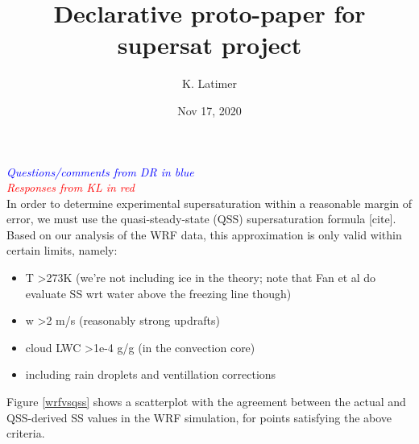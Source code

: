 \documentclass{article}
\title{Declarative proto-paper for supersat project}
\author{K. Latimer}
\date{Nov 17, 2020}
\newcommand{\drcomm}[1]{\textcolor{blue}{\textit{#1}}}
\newcommand{\klcomm}[1]{\textcolor{red}{\textit{#1}}}
\begin{document}
\maketitle

\noindent\drcomm{Questions/comments from DR in blue} \\
\noindent\klcomm{Responses from KL in red}\\

In order to determine experimental supersaturation within a reasonable margin of error, we must use the quasi-steady-state (QSS) supersaturation formula [cite]. Based on our analysis of the WRF data, this approximation is only valid within certain limits, namely:
\begin{itemize}
	\item T \textgreater  273K (we're not including ice in the theory; note that Fan et al do evaluate SS wrt water above the freezing line though)
	\item w \textgreater  2 m/s (reasonably strong updrafts)
	\item cloud LWC \textgreater  1e-4 g/g (in the convection core)
	\item including rain droplets and ventillation corrections
\end{itemize}

Figure \ref{wrfvsqss} shows a scatterplot with the agreement between the actual and QSS-derived SS values in the WRF simulation, for points satisfying the above criteria.

\clearpage
\newpage
\end{document}
